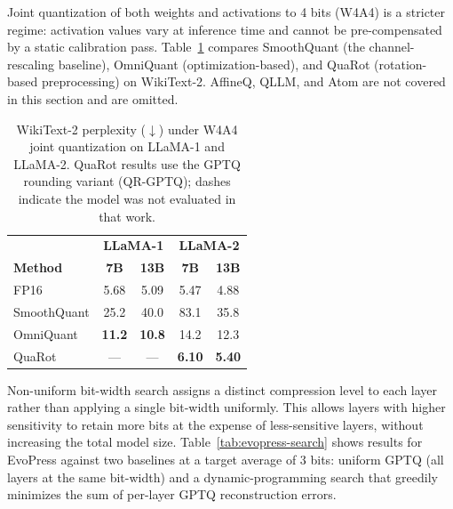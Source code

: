 Joint quantization of both weights and activations to 4 bits (W4A4) is a stricter regime: activation values vary at inference time and cannot be pre-compensated by a static calibration pass. Table~\ref{tab:w4a4-comparison} compares SmoothQuant (the channel-rescaling baseline), OmniQuant (optimization-based), and QuaRot (rotation-based preprocessing) on WikiText-2. AffineQ, QLLM, and Atom are not covered in this section and are omitted.

\begin{table}[htbp]
\centering
\caption[W4A4 perplexity comparison]{WikiText-2 perplexity ($\downarrow$) under W4A4 joint quantization on LLaMA-1 and LLaMA-2. QuaRot results use the GPTQ rounding variant (QR-GPTQ); dashes indicate the model was not evaluated in that work.}
\label{tab:w4a4-comparison}
\begin{tabular}{lcccc}
  \toprule
  & \multicolumn{2}{c}{\textbf{LLaMA-1}} & \multicolumn{2}{c}{\textbf{LLaMA-2}} \\
  \textbf{Method} & \textbf{7B} & \textbf{13B} & \textbf{7B} & \textbf{13B} \\
  \midrule
  FP16        & 5.68 & 5.09 & 5.47 & 4.88 \\
  \midrule
  SmoothQuant & 25.2 & 40.0 & 83.1 & 35.8 \\
  OmniQuant   & \textbf{11.2} & \textbf{10.8} & 14.2 & 12.3 \\
  QuaRot      & —    & —    & \textbf{6.10} & \textbf{5.40} \\
  \bottomrule
\end{tabular}
\end{table}

Non-uniform bit-width search assigns a distinct compression level to each layer rather than applying a single bit-width uniformly. This allows layers with higher sensitivity to retain more bits at the expense of less-sensitive layers, without increasing the total model size. Table~\ref{tab:evopress-search} shows results for EvoPress against two baselines at a target average of 3 bits: uniform GPTQ (all layers at the same bit-width) and a dynamic-programming search that greedily minimizes the sum of per-layer GPTQ reconstruction errors.


